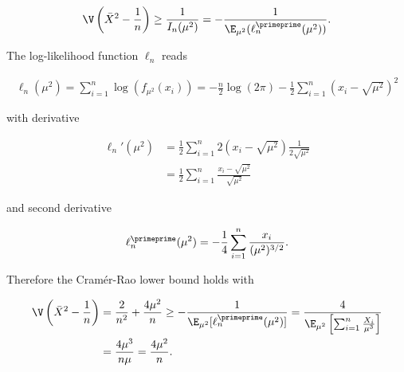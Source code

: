 \begin{solution}
\begin{enumerate}[label = (\alph*)]
  \begin{align*}
    \V\left(\bar{X}^2 - \frac{1}{n}\right) \geq \frac{1}{I_n(\mu^2)}
    = -\frac{1}{\E_{\mu^2}(\ell_n^{\primeprime}(\mu^2))}.
  \end{align*}

  The log-likelihood function $\ell_n$ reads
  
  \begin{align*}
    \ell_n(\mu^2) = \sum_{i=1}^n \log(f_{\mu^2}(x_i))
    = -\frac{n}{2}\log(2\pi) -\frac{1}{2}\sum_{i=1}^n (x_i - \sqrt{\mu^2})^2
  \end{align*}

  with derivative

  \begin{align*}
    \ell_n'(\mu^2) &= \frac{1}{2}\sum_{i=1}^n 2 (x_i - \sqrt{\mu^2})\frac{1}{2\sqrt{\mu^2}} \\
    &= \frac{1}{2}\sum_{i=1}^n \frac{x_i - \sqrt{\mu^2}}{\sqrt{\mu^2}}
  \end{align*}

  and second derivative

  \begin{align*}
    \ell_n^{\primeprime}(\mu^2) = -\frac{1}{4}\sum_{i=1}^n \frac{x_i}{(\mu^2)^{3/2}}.
  \end{align*}

  Therefore the Cramér-Rao lower bound holds with

  \begin{align*}
    \V\left(\bar{X}^2 - \frac{1}{n}\right) &= \frac{2}{n^2} + \frac{4\mu^2}{n}
    \geq -\frac{1}{\E_{\mu^2}[\ell_n^{\primeprime}(\mu^2)]} 
    = \frac{4}{\E_{\mu^2}\left[\sum_{i=1}^n \frac{X_i}{\mu^3}\right]} \\
    &= \frac{4\mu^3}{n\mu} = \frac{4\mu^2}{n}.
  \end{align*}
\end{enumerate}
    
\end{solution}
    
    